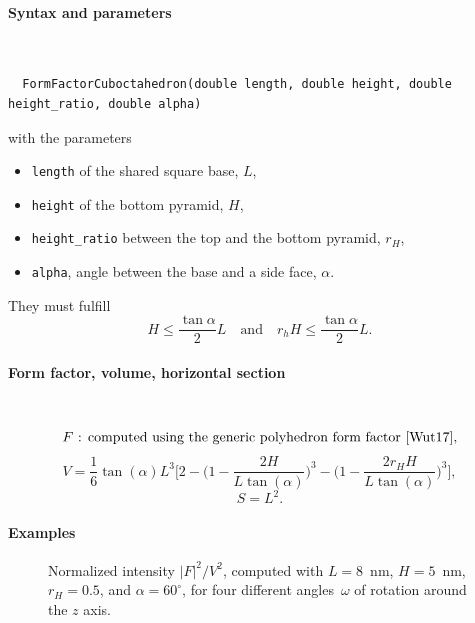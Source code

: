 \paragraph{Syntax and parameters}\strut\\[-2ex plus .2ex minus .2ex]
\begin{lstlisting}
  FormFactorCuboctahedron(double length, double height, double height_ratio, double alpha)
\end{lstlisting}
with the parameters
\begin{itemize}
\item \texttt{length} of the shared square base, $L$,
\item \texttt{height} of the bottom pyramid, $H$,
\item \texttt{height\_ratio} between the top and the bottom pyramid, $r_H$,
\item \texttt{alpha}, angle between the base and a side face, $\alpha$.
\end{itemize}
They must fulfill
\begin{displaymath}
  H \le \frac{\tan\alpha}{2} L
  \quad\text{and}\quad
  r_h H \le \frac{\tan\alpha}{2} L.
\end{displaymath}

\paragraph{Form factor, volume, horizontal section}\strut\\
\begin{equation*}
  F \text{~: computed using the generic polyhedron form factor~\cite{Wut17},}
\end{equation*}
\begin{equation*}
  V= \dfrac{1}{6} \tan(\alpha)L^3 \Big[ 2
         - \Big(1 - \dfrac{2H }{L\tan(\alpha)} \Big)^3
           - \Big(1 - \dfrac{2 r_H
             H}{L\tan(\alpha) }\Big)^3\Big],
\end{equation*}
\begin{equation*}
  S =L^2.
\end{equation*}

\paragraph{Examples}\strut

\begin{figure}[H]
\begin{center}
\end{center}
\caption{Normalized intensity $|F|^2/V^2$,
computed with $L=8$~nm, $H=5$~nm, $r_H=0.5$, and $\alpha=60^\circ$,
for four different angles~$\omega$ of rotation around the $z$ axis.}
\end{figure}

